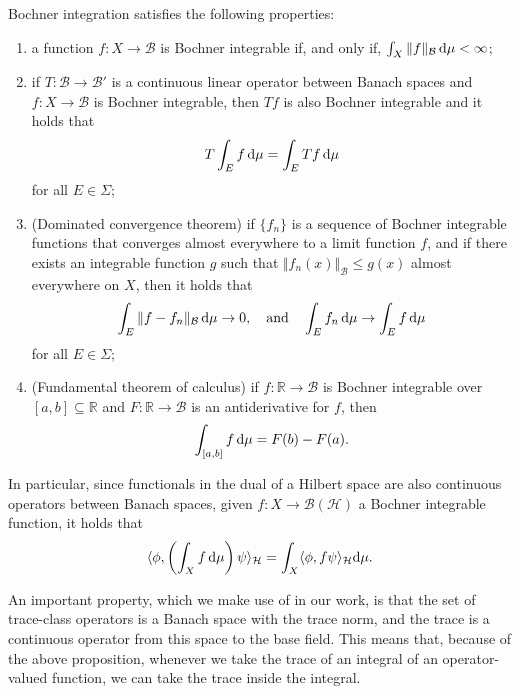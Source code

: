 \begin{appendices}
\begin{proposition}
	Bochner integration satisfies the following properties:
	\begin{enumerate}
		\item a function $f:X\to\mathcal{B}$ is Bochner integrable if, and only if,
			$\int_X\Vert f\Vert_{\mathcal{B}}\,\mathrm{d}\mu < \infty$;
		\item if $T:\mathcal{B}\to\mathcal{B}'$ is a continuous linear operator between Banach
			spaces and $f:X\to\mathcal{B}$ is Bochner integrable, then $Tf$ is also Bochner
			integrable and it holds that
			\begin{align*}
				T\int_E f\,\mathrm{d}\mu = \int_E Tf\,\mathrm{d}\mu
			\end{align*}
			for all $E\in\Sigma$;
		\item (Dominated convergence theorem) if $\{f_n\}$ is a sequence of Bochner integrable
			functions that converges almost everywhere to a limit function $f$, and if there
			exists an integrable function $g$ such that $\Vert f_n(x)\Vert_{\mathcal{B}} \leq g(x)$
			almost everywhere on $X$, then it holds that
			\begin{align*}
				\int_E \Vert f - f_n\Vert_{\mathcal{B}}\,\mathrm{d}\mu \to 0,
				\quad\text{and}\quad
				\int_E f_n\,\mathrm{d}\mu \to \int_E f\,\mathrm{d}\mu
			\end{align*}
			for all $E\in\Sigma$;
		\item (Fundamental theorem of calculus) if $f:\mathbb{R}\to\mathcal{B}$ is Bochner
			integrable over $[a,b]\subseteq\mathbb{R}$ and $F:\mathbb{R}\to\mathcal{B}$ is an
			antiderivative for $f$, then
			\begin{align*}
				\int_{[a,b]} f\,\mathrm{d}\mu = F(b)-F(a).
			\end{align*}
	\end{enumerate}
\end{proposition}

\begin{remark}
	In particular, since functionals in the dual of a Hilbert space are also continuous
	operators between Banach spaces, given $f:X\to\mathcal{B}(\mathcal{H})$ a Bochner
	integrable function, it holds that
	\begin{align*}
		\langle\phi,\left(\int_X f\,\mathrm{d}\mu\right)\psi\rangle_{\mathcal{H}} = \int_X\langle\phi,f\psi\rangle_{\mathcal{H}}\mathrm{d}\mu.
	\end{align*}
\end{remark}

\begin{remark}
	An important property, which we make use of in our work, is that the set of trace-class
	operators is a Banach space with the trace norm, and the trace is a continuous operator
	from this space to the base field. This means that, because of the above proposition,
	whenever we take the trace of an integral of an operator-valued function, we can take the
	trace inside the integral.
\end{remark}


\end{appendices}

